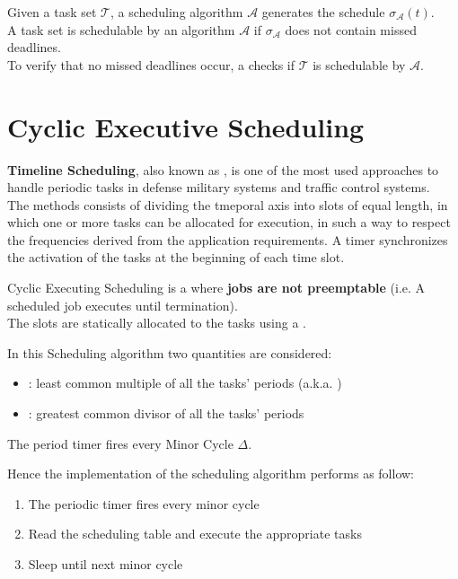 Given a task set $\mathcal{T}$, a scheduling algorithm $\mathcal{A}$ generates the schedule $\sigma_\mathcal{A}(t)$.\\
A task set is schedulable by an algorithm $\mathcal{A}$ if $\sigma_\mathcal{A}$ does not contain missed deadlines.\\
To verify that no missed deadlines occur, a  checks if $\mathcal{T}$ is schedulable by $\mathcal{A}$.

\section{Cyclic Executive Scheduling}

\textbf{Timeline Scheduling}, also known as , is one of the most used approaches to handle periodic tasks in defense military systems and traffic control systems.\\
The methods consists of dividing the tmeporal axis into slots of equal length, in which one or more tasks can be allocated for execution, in such a way to respect the frequencies derived from the application requirements. A timer synchronizes the activation of the tasks at the beginning of each time slot.

Cyclic Executing Scheduling is a  where \textbf{jobs are not preemptable} (i.e. A scheduled job executes until termination).\\
The slots are statically allocated to the tasks using a .

In this Scheduling algorithm two quantities are considered:
\begin{itemize}
    \item {}: least common multiple of all the tasks' periods (a.k.a. )
    \item {}: greatest common divisor of all the tasks' periods
\end{itemize}
The period timer fires every Minor Cycle $\Delta$.

Hence the implementation of the scheduling algorithm performs as follow:
\begin{enumerate}
    \item The periodic timer fires every minor cycle
    \item Read the scheduling table and execute the appropriate tasks
    \item Sleep until next minor cycle
\end{enumerate}

